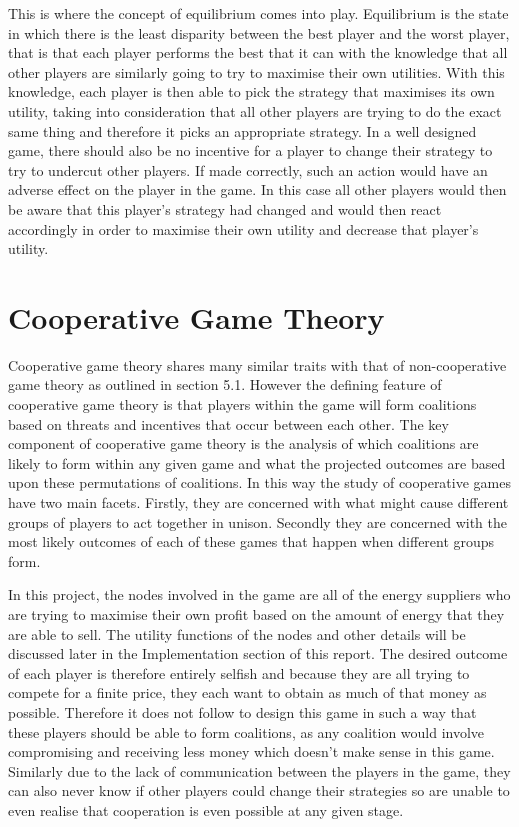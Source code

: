 \documentclass[a4paper, notitlepage]{report}
\begin{document}
This is where the concept of equilibrium comes into play. Equilibrium is the
state in which there is the least disparity between the best player and the
worst player, that is that each player performs the best that it can with the
knowledge that all other players are similarly going to try to maximise their
own utilities. With this knowledge, each player is then able to pick the
strategy that maximises its own utility, taking into consideration that all
other players are trying to do the exact same thing and therefore it picks an
appropriate strategy. In a well designed game, there should also be no incentive
for a player to change their strategy to try to undercut other players. If made
correctly, such an action would have an adverse effect on the player in the
game. In this case all other players would then be aware that this player’s
strategy had changed and would then react accordingly in order to maximise their
own utility and decrease that player’s utility.
\section{Cooperative Game Theory}
\label{sec:org0065727}
Cooperative game theory shares many similar traits with that of non-cooperative
game theory as outlined in section 5.1. However the defining feature of
cooperative game theory is that players within the game will form coalitions
based on threats and incentives that occur between each other. The key component
of cooperative game theory is the analysis of which coalitions are likely to
form within any given game and what the projected outcomes are based upon these
permutations of coalitions. In this way the study of cooperative games have two
main facets. Firstly, they are concerned with what might cause different groups
of players to act together in unison. Secondly they are concerned with the most
likely outcomes of each of these games that happen when different groups form.

In this project, the nodes involved in the game are all of the energy suppliers
who are trying to maximise their own profit based on the amount of energy that
they are able to sell. The utility functions of the nodes and other details will
be discussed later in the Implementation section of this report. The desired
outcome of each player is therefore entirely selfish and because they are all
trying to compete for a finite price, they each want to obtain as much of that
money as possible. Therefore it does not follow to design this game in such a
way that these players should be able to form coalitions, as any coalition would
involve compromising and receiving less money which doesn’t make sense in this
game. Similarly due to the lack of communication between the players in the
game, they can also never know if other players could change their strategies so
are unable to even realise that cooperation is even possible at any given stage.
\end{document}
